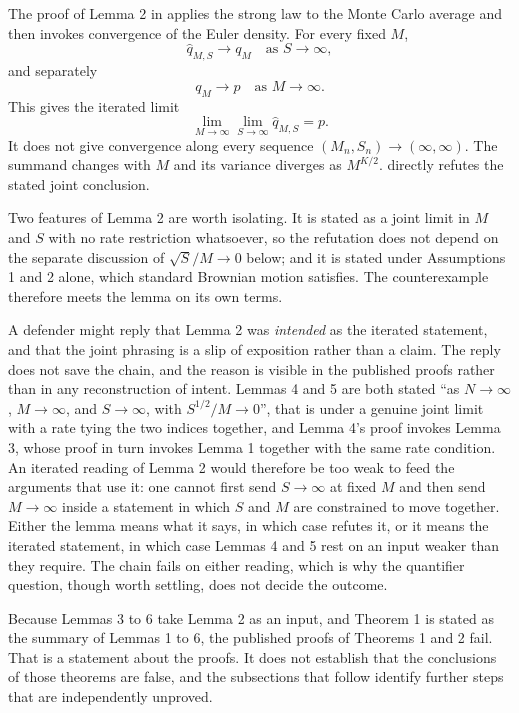 \documentclass[11pt]{article}
\theoremstyle{definition}
\begin{document}
The proof of Lemma 2 in \citet{BrandtSantaClara2002} applies the strong law to the Monte Carlo average and then invokes convergence of the Euler density. For every fixed $M$,
\[
\widehat q_{M,S}\to q_M\quad\text{as }S\to\infty,
\]
and separately
\[
q_M\to p\quad\text{as }M\to\infty.
\]
This gives the iterated limit
\[
\lim_{M\to\infty}\lim_{S\to\infty}\widehat q_{M,S}=p.
\]
It does not give convergence along every sequence $(M_n,S_n)\to(\infty,\infty)$. The summand changes with $M$ and its variance diverges as $M^{K/2}$.  directly refutes the stated joint conclusion.

Two features of Lemma 2 are worth isolating. It is stated as a joint limit in $M$ and $S$ with no rate restriction whatsoever, so the refutation does not depend on the separate discussion of $\sqrt S/M\to0$ below; and it is stated under Assumptions 1 and 2 alone, which standard Brownian motion satisfies. The counterexample therefore meets the lemma on its own terms.

A defender might reply that Lemma 2 was \emph{intended} as the iterated statement, and that the joint phrasing is a slip of exposition rather than a claim. The reply does not save the chain, and the reason is visible in the published proofs rather than in any reconstruction of intent. Lemmas 4 and 5 are both stated ``as $N\to\infty$, $M\to\infty$, and $S\to\infty$, with $S^{1/2}/M\to0$'', that is under a genuine joint limit with a rate tying the two indices together, and Lemma 4's proof invokes Lemma 3, whose proof in turn invokes Lemma 1 together with the same rate condition. An iterated reading of Lemma 2 would therefore be too weak to feed the arguments that use it: one cannot first send $S\to\infty$ at fixed $M$ and then send $M\to\infty$ inside a statement in which $S$ and $M$ are constrained to move together. Either the lemma means what it says, in which case  refutes it, or it means the iterated statement, in which case Lemmas 4 and 5 rest on an input weaker than they require. The chain fails on either reading, which is why the quantifier question, though worth settling, does not decide the outcome.

Because Lemmas 3 to 6 take Lemma 2 as an input, and Theorem 1 is stated as the summary of Lemmas 1 to 6, the published proofs of Theorems 1 and 2 fail. That is a statement about the proofs. It does not establish that the conclusions of those theorems are false, and the subsections that follow identify further steps that are independently unproved.
\end{document}
